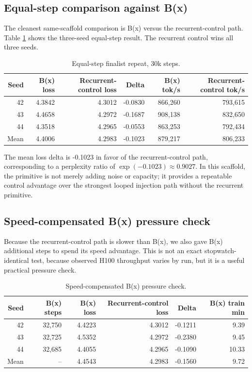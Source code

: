 \documentclass[11pt]{article}
\newcommand{\bx}{B(x)}
\begin{document}
\subsection{Equal-step comparison against \bx{}}

The cleanest same-scaffold comparison is \bx{} versus the recurrent-control
path. Table \ref{tab:bx} shows the three-seed equal-step result. The recurrent
control wins all three seeds.

\begin{table}[h]
\centering
\caption{Equal-step finalist repeat, 30k steps.}
\label{tab:bx}
\begin{tabular}{rrrrrr}
\toprule
Seed & \bx{} loss & Recurrent-control loss & Delta & \bx{} tok/s & Recurrent-control tok/s \\
\midrule
42 & 4.3842 & 4.3012 & -0.0830 & 866,260 & 793,615 \\
43 & 4.4658 & 4.2972 & -0.1687 & 908,138 & 832,650 \\
44 & 4.3518 & 4.2965 & -0.0553 & 863,253 & 792,434 \\
\midrule
Mean & 4.4006 & 4.2983 & -0.1023 & 879,217 & 806,233 \\
\bottomrule
\end{tabular}
\end{table}

The mean loss delta is -0.1023 in favor of the recurrent-control path, corresponding to a
perplexity ratio of $\exp(-0.1023) \approx 0.9027$. In this scaffold, the
primitive is not merely adding noise or capacity; it provides a repeatable
control advantage over the strongest looped injection path without the
recurrent primitive.

\subsection{Speed-compensated \bx{} pressure check}

Because the recurrent-control path is slower than \bx{}, we also gave \bx{} additional steps
to spend its speed advantage. This is not an exact stopwatch-identical test,
because observed H100 throughput varies by run, but it is a useful practical
pressure check.

\begin{table}[h]
\centering
\caption{Speed-compensated \bx{} pressure check.}
\label{tab:bxspeed}
\begin{tabular}{rrrrrr}
\toprule
Seed & \bx{} steps & \bx{} loss & Recurrent-control loss & Delta & \bx{} train min \\
\midrule
42 & 32,750 & 4.4223 & 4.3012 & -0.1211 & 9.39 \\
43 & 32,725 & 4.5352 & 4.2972 & -0.2380 & 9.45 \\
44 & 32,685 & 4.4055 & 4.2965 & -0.1090 & 10.33 \\
\midrule
Mean & -- & 4.4543 & 4.2983 & -0.1560 & 9.72 \\
\bottomrule
\end{tabular}
\end{table}
\end{document}
